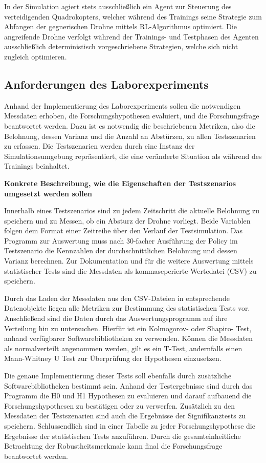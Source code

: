 In der Simulation agiert stets ausschließlich ein Agent zur Steuerung des verteidigenden Quadrokopters, welcher während des Trainings seine Strategie zum Abfangen der gegnerischen Drohne mittels RL-Algorithmus optimiert. 
Die angreifende Drohne verfolgt während der Trainings- und Testphasen des Agenten ausschließlich deterministisch vorgeschriebene Strategien, welche sich nicht zugleich optimieren.

\subsection{Anforderungen des Laborexperiments}

Anhand der Implementierung des Laborexperiments sollen die notwendigen Messdaten erhoben, die Forschungshypothesen evaluiert, und die Forschungsfrage beantwortet werden.
Dazu ist es notwendig die beschriebenen Metriken, also die Belohnung, dessen Varianz und die Anzahl an Abstürzen, zu allen Testszenarien zu erfassen.
Die Testszenarien werden durch eine Instanz der Simulationsumgebung repräsentiert, die eine veränderte Situation als während des Trainings beinhaltet.

\textbf{Konkrete Beschreibung, wie die Eigenschaften der Testszenarios umgesetzt werden sollen}

Innerhalb eines Testszenarios sind zu jedem Zeitschritt die aktuelle Belohnung zu speichern und zu Messen, ob ein Absturz der Drohne vorliegt.
Beide Variablen folgen dem Format einer Zeitreihe über den Verlauf der Testsimulation.
Das Programm zur Auswertung muss nach 30-facher Ausführung der Policy im Testszenario die Kennzahlen der durchschnittlichen Belohnung und dessen Varianz berechnen.
Zur Dokumentation und für die weitere Auswertung mittels statistischer Tests sind die Messdaten als kommaseperierte Wertedatei (CSV) zu speichern.

Durch das Laden der Messdaten aus den CSV-Dateien in entsprechende Datenobjekte liegen alle Metriken zur Bestimmung des statistischen Tests vor.
Anschließend sind die Daten durch das Auswertungsprogramm auf ihre Verteilung hin zu untersuchen.
Hierfür ist ein Kolmogorov- oder Shapiro- Test, anhand verfügbarer Softwarebibliotheken zu verwenden.
Können die Messdaten als normalverteilt angenommen werden, gilt es ein T-Test, andernfalls einen Mann-Whitney U Test zur Überprüfung der Hypothesen einzusetzen.

Die genaue Implementierung dieser Tests soll ebenfalls durch zusätzliche Softwarebibliotheken bestimmt sein.
Anhand der Testergebnisse sind durch das Programm die H0 und H1 Hypothesen zu evaluieren und darauf aufbauend die Forschungshypothesen zu bestätigen oder zu verwerfen.
Zusätzlich zu den Messdaten der Testszenarien sind auch die Ergebnisse der Signifikanztests zu speichern.
Schlussendlich sind in einer Tabelle zu jeder Forschungshypothese die Ergebnisse der statistischen Tests anzuführen.
Durch die gesamteinheitliche Betrachtung der Robustheitsmerkmale kann final die Forschungsfrage beantwortet werden.

